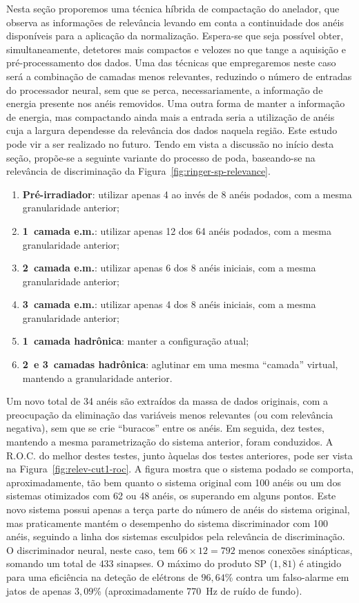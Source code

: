 Nesta seção proporemos uma técnica híbrida de compactação do anelador, que
observa as informações de relevância levando em conta a continuidade dos anéis
disponíveis para a aplicação da normalização. Espera-se que seja possível
obter, simultaneamente, detetores mais compactos e velozes no que tange a
aquisição e pré-processamento dos dados. Uma das técnicas que empregaremos
neste caso será a combinação de camadas menos relevantes, reduzindo o número
de entradas do processador neural, sem que se perca, necessariamente, a
informação de energia presente nos anéis removidos. Uma outra forma de manter
a informação de energia, mas compactando ainda mais a entrada seria a
utilização de anéis cuja a largura dependesse da relevância dos dados naquela
região. Este estudo pode vir a ser realizado no futuro. Tendo em vista a
discussão no início desta seção, propõe-se a seguinte variante do processo de
poda, baseando-se na relevância de discriminação da
Figura~\ref{fig:ringer-sp-relevance}.

\begin{enumerate}
\item \textbf{Pré-irradiador}: utilizar apenas 4 ao invés de 8 anéis podados,
com a mesma granularidade anterior;
\item \textbf{1\eira\ camada e.m.}: utilizar apenas 12 dos 64 anéis podados,
com a mesma granularidade anterior;
\item \textbf{2\eira\ camada e.m.}: utilizar apenas 6 dos 8 anéis iniciais,
com a mesma granularidade anterior;
\item \textbf{3\eira\ camada e.m.}: utilizar apenas 4 dos 8 anéis iniciais,
com a mesma granularidade anterior;
\item \textbf{1\eira\ camada hadrônica}: manter a configuração atual;
\item \textbf{2\eira\ e 3\eira\ camadas hadrônica}: aglutinar em uma mesma
``camada'' virtual, mantendo a granularidade anterior.
\end{enumerate} 

Um novo total de 34 anéis são extraídos da massa de dados originais, com a
preocupação da eliminação das variáveis menos relevantes (ou com relevância
negativa), sem que se crie ``buracos'' entre os anéis. Em seguida, dez testes,
mantendo a mesma parametrização do sistema anterior, foram conduzidos. A
R.O.C. do melhor destes testes, junto àquelas dos testes anteriores, pode ser
vista na Figura~\ref{fig:relev-cut1-roc}. A figura mostra que o sistema podado
se comporta, aproximadamente, tão bem quanto o sistema original com 100 anéis
ou um dos sistemas otimizados com 62 ou 48 anéis, os superando em alguns
pontos. Este novo sistema possui apenas a terça parte do número de anéis do
sistema original, mas praticamente mantém o desempenho do sistema
discriminador com 100 anéis, seguindo a linha dos sistemas esculpidos pela
relevância de discriminação. O discriminador neural, neste caso, tem $66
\times 12 = 792$ menos conexões sinápticas, somando um total de $433$
sinapses. O máximo do produto SP ($1,81$) é atingido para uma eficiência na
deteção de elétrons de $96,64$\% contra um falso-alarme em jatos de apenas
$3,09$\% (aproximadamente 770~Hz de ruído de fundo).

